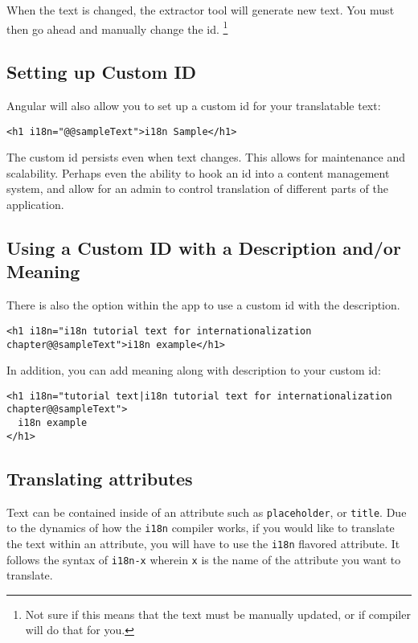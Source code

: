 When the text is changed, the extractor tool will generate new text. You 
must then go ahead and manually change the id. \footnote{Not sure if this 
means that the text must be manually updated, or if compiler will do that
for you.} 

\subsection{Setting up Custom ID}
Angular will also allow you to set up a custom id for your translatable text:
\begin{lstlisting}
<h1 i18n="@@sampleText">i18n Sample</h1>
\end{lstlisting}

The custom id persists even when text changes. This allows for maintenance 
and scalability. Perhaps even the ability to hook an id into a content 
management system, and allow for an admin to control translation of different
parts of the application. 

\subsection{Using a Custom ID with a Description and/or Meaning}
There is also the option within the app to use a custom id with the 
description. 
\begin{lstlisting}[caption=custom id with description]
<h1 i18n="i18n tutorial text for internationalization chapter@@sampleText">i18n example</h1>
\end{lstlisting}

In addition, you can add meaning along with description to your custom id:
\begin{lstlisting}[caption=custom id with meaning and description]
<h1 i18n="tutorial text|i18n tutorial text for internationalization chapter@@sampleText">
  i18n example
</h1>
\end{lstlisting}


\subsection{Translating attributes}
Text can be contained inside of an attribute such as \lstinline{placeholder}, 
or \lstinline{title}. Due to the dynamics of how the \lstinline{i18n} compiler 
works, if you would like to translate the text within an attribute, you will 
have to use the \lstinline{i18n} flavored attribute. It follows the syntax of 
\lstinline{i18n-x} wherein \lstinline{x} is the name of the attribute you want
to translate. 

